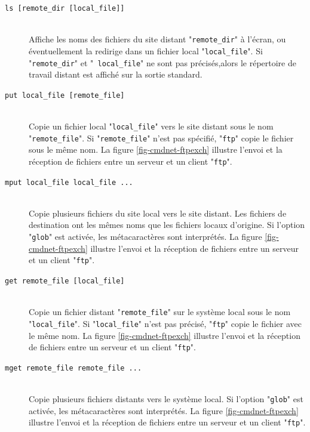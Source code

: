 \begin{description}
	\item[{\tt ls [remote\_dir [local\_file]]}]\mbox{}\\
	Affiche les noms des fichiers du site distant "{\tt remote\_dir}"
	{\`a} l'{\'e}cran, ou {\'e}ventuellement la redirige dans un fichier local
	"{\tt local\_file}". Si "{\tt remote\_dir}" et "{\tt
	local\_file}" ne sont pas pr{\'e}cis{\'e}s,alors le r{\'e}pertoire de travail
	distant est affich{\'e} sur la sortie standard.


	\item[{\tt put local\_file [remote\_file]}]\mbox{}\\
	Copie un fichier local "{\tt local\_file}" vers le site distant
	sous le nom "{\tt remote\_file}". Si "{\tt remote\_file}" n'est
	pas sp{\'e}cifi{\'e}, "{\tt ftp}" copie le fichier sous le m{\^e}me nom. La figure
	\ref{fig-cmdnet-ftpexch} illustre l'envoi et la r{\'e}ception de fichiers
	entre un serveur et un client "{\tt ftp}".


	\item[{\tt mput local\_file local\_file ...}]\mbox{}\\
	Copie plusieurs fichiers du site local vers le site distant. Les
	fichiers de destination ont les m{\^e}mes noms que les fichiers locaux
	d'origine. Si l'option "{\tt glob}" est activ{\'e}e, les
	m{\'e}tacaract{\`e}res sont interpr{\'e}t{\'e}s. La figure \ref{fig-cmdnet-ftpexch}
	illustre l'envoi et la r{\'e}ception de fichiers entre un serveur et un
	client "{\tt ftp}".


	\item[{\tt get remote\_file [local\_file]}]\mbox{}\\
	Copie un fichier distant "{\tt remote\_file}" sur le syst{\`e}me local
	sous le nom "{\tt local\_file}". Si "{\tt local\_file}" n'est
	pas pr{\'e}cis{\'e}, "{\tt ftp}" copie le fichier avec le m{\^e}me nom. La figure
	\ref{fig-cmdnet-ftpexch} illustre l'envoi et la r{\'e}ception de fichiers
	entre un serveur et un client "{\tt ftp}".


	\item[{\tt mget remote\_file remote\_file ...}]\mbox{}\\
	Copie plusieurs fichiers distants vers le syst{\`e}me local. Si l'option
	"{\tt glob}" est activ{\'e}e, les m{\'e}tacaract{\`e}res sont interpr{\'e}t{\'e}s. La figure
	\ref{fig-cmdnet-ftpexch} illustre l'envoi et la r{\'e}ception de fichiers
	entre un serveur et un client "{\tt ftp}".
	

\end{description}
